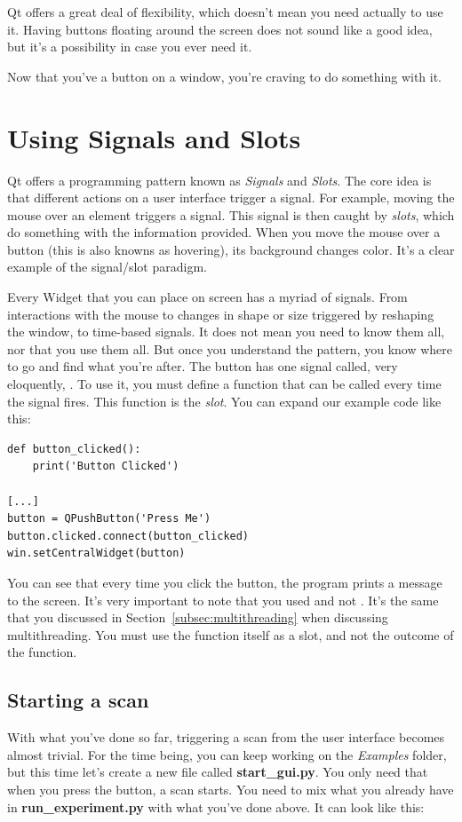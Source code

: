 Qt offers a great deal of flexibility, which doesn't mean you need actually to use it. Having buttons floating around the screen does not sound like a good idea, but it's a possibility in case you ever need it.

Now that you've a button on a window, you're craving to do something with it.


\section{Using Signals and Slots}\label{sec:signals-slots}
Qt offers a programming pattern known as \emph{Signals} and \emph{Slots}. The core idea is that different actions on a user interface trigger a signal. For example, moving the mouse over an element triggers a signal. This signal is then caught by \emph{slots}, which do something with the information provided. When you move the mouse over a button (this is also knowns as hovering), its background changes color. It's a clear example of the signal/slot paradigm.

Every Widget that you can place on screen has a myriad of signals. From interactions with the mouse to changes in shape or size triggered by reshaping the window, to time-based signals. It does not mean you need to know them all, nor that you use them all. But once you understand the pattern, you know where to go and find what you're after. The button has one signal called, very eloquently, . To use it, you must define a function that can be called every time the signal fires. This function is the \emph{slot}. You can expand our example code like this:

\begin{verbatim}
def button_clicked():
    print('Button Clicked')

[...]
button = QPushButton('Press Me')
button.clicked.connect(button_clicked)
win.setCentralWidget(button)
\end{verbatim}

You can see that every time you click the button, the program prints a message to the screen. It's very important to note that you used  and not . It's the same that you discussed in Section~\ref{subsec:multithreading} when discussing multithreading. You must use the function itself as a slot, and not the outcome of the function.

\subsection{Starting a scan}\label{subsec:start-scan-gui}
With what you've done so far, triggering a scan from the user interface becomes almost trivial. For the time being, you can keep working on the \emph{Examples} folder, but this time let's create a new file called \textbf{start\_gui.py}. You only need that when you press the button, a scan starts. You need to mix what you already have in \textbf{run\_experiment.py} with what you've done above. It can look like this:

